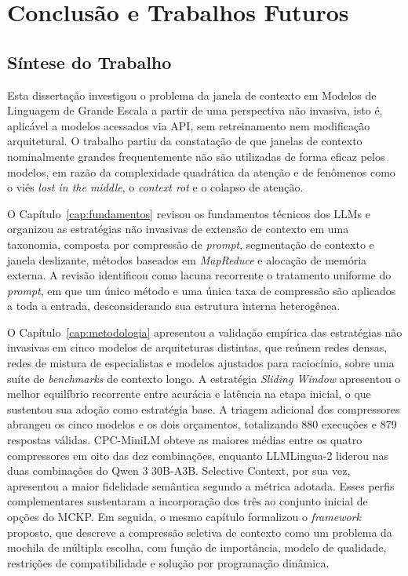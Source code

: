 \chapter{Conclusão e Trabalhos Futuros}
\label{cap:conclusao}

\section{Síntese do Trabalho}
\label{sec:sintese}

Esta dissertação investigou o problema da janela de contexto em Modelos de Linguagem de Grande Escala a partir de uma perspectiva não invasiva, isto é, aplicável a modelos acessados via API, sem retreinamento nem modificação arquitetural. O trabalho partiu da constatação de que janelas de contexto nominalmente grandes frequentemente não são utilizadas de forma eficaz pelos modelos, em razão da complexidade quadrática da atenção e de fenômenos como o viés \textit{lost in the middle}, o \textit{context rot} e o colapso de atenção.

O Capítulo~\ref{cap:fundamentos} revisou os fundamentos técnicos dos LLMs e organizou as estratégias não invasivas de extensão de contexto em uma taxonomia, composta por compressão de \textit{prompt}, segmentação de contexto e janela deslizante, métodos baseados em \textit{MapReduce} e alocação de memória externa. A revisão identificou como lacuna recorrente o tratamento uniforme do \textit{prompt}, em que um único método e uma única taxa de compressão são aplicados a toda a entrada, desconsiderando sua estrutura interna heterogênea.

O Capítulo~\ref{cap:metodologia} apresentou a validação empírica das estratégias não invasivas em cinco modelos de arquiteturas distintas, que reúnem redes densas, redes de mistura de especialistas e modelos ajustados para raciocínio, sobre uma suíte de \textit{benchmarks} de contexto longo. A estratégia \textit{Sliding Window} apresentou o melhor equilíbrio recorrente entre acurácia e latência na etapa inicial, o que sustentou sua adoção como estratégia base. A triagem adicional dos compressores abrangeu os cinco modelos e os dois orçamentos, totalizando 880 execuções e 879 respostas válidas. CPC-MiniLM obteve as maiores médias entre os quatro compressores em oito das dez combinações, enquanto LLMLingua-2 liderou nas duas combinações do Qwen 3 30B-A3B. Selective Context, por sua vez, apresentou a maior fidelidade semântica segundo a métrica adotada. Esses perfis complementares sustentaram a incorporação dos três ao conjunto inicial de opções do MCKP. Em seguida, o mesmo capítulo formalizou o \textit{framework} proposto, que descreve a compressão seletiva de contexto como um problema da mochila de múltipla escolha, com função de importância, modelo de qualidade, restrições de compatibilidade e solução por programação dinâmica.

